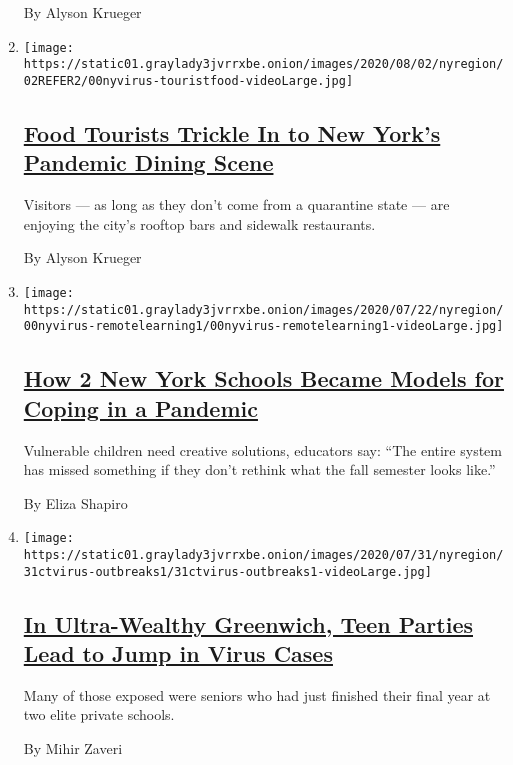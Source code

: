 \begin{enumerate}
  By Alyson Krueger
\item
  \texttt{[image: https://static01.graylady3jvrrxbe.onion/images/2020/08/02/nyregion/02REFER2/00nyvirus-touristfood-videoLarge.jpg]}

  \hypertarget{food-tourists-trickle-in-to-new-yorks-pandemic-dining-scene}{%
  \subsection{\texorpdfstring{\href{/2020/07/30/nyregion/coronavirus-nyc-tourism-restaurants.html}{Food
  Tourists Trickle In to New York's Pandemic Dining
  Scene}}{Food Tourists Trickle In to New York's Pandemic Dining Scene}}\label{food-tourists-trickle-in-to-new-yorks-pandemic-dining-scene}}

  Visitors --- as long as they don't come from a quarantine state ---
  are enjoying the city's rooftop bars and sidewalk restaurants.

  By Alyson Krueger
\item
  \texttt{[image: https://static01.graylady3jvrrxbe.onion/images/2020/07/22/nyregion/00nyvirus-remotelearning1/00nyvirus-remotelearning1-videoLarge.jpg]}

  \hypertarget{how-2-new-york-schools-became-models-for-coping-in-a-pandemic}{%
  \subsection{\texorpdfstring{\href{/2020/07/31/nyregion/nyc-homeless-children-school.html}{How
  2 New York Schools Became Models for Coping in a
  Pandemic}}{How 2 New York Schools Became Models for Coping in a Pandemic}}\label{how-2-new-york-schools-became-models-for-coping-in-a-pandemic}}

  Vulnerable children need creative solutions, educators say: ``The
  entire system has missed something if they don't rethink what the fall
  semester looks like.''

  By Eliza Shapiro
\item
  \texttt{[image: https://static01.graylady3jvrrxbe.onion/images/2020/07/31/nyregion/31ctvirus-outbreaks1/31ctvirus-outbreaks1-videoLarge.jpg]}

  \hypertarget{in-ultra-wealthy-greenwich-teen-parties-lead-to-jump-in-virus-cases}{%
  \subsection{\texorpdfstring{\href{/2020/07/31/nyregion/greenwich-ct-coronavirus-covid-parties.html}{In
  Ultra-Wealthy Greenwich, Teen Parties Lead to Jump in Virus
  Cases}}{In Ultra-Wealthy Greenwich, Teen Parties Lead to Jump in Virus Cases}}\label{in-ultra-wealthy-greenwich-teen-parties-lead-to-jump-in-virus-cases}}

  Many of those exposed were seniors who had just finished their final
  year at two elite private schools.

  By Mihir Zaveri
\end{enumerate}

